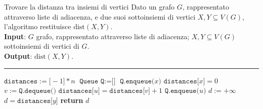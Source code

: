 \documentclass[a4paper, 12pt]{report}
\begin{document}
    \begin{framedalgo}[breakable]{Trovare la distanza tra insiemi di vertici}
        Dato un grafo $G$, rappresentato attraverso liste di adiacenza, e due suoi sottoinsiemi di vertici $X, Y \subseteq V(G)$, l'algoritmo restituisce $\mathrm{dist}(X, Y)$.\\
        \textbf{Input}: $G$ grafo, rappresentato attraverso liste di adiacenza; $X, Y \subseteq V(G)$ sottoinsiemi di vertici di $G$.\\
        \textbf{Output}: $\mathrm{dist}(X, Y)$.

        \hrule
        \begin{algorithmic}[1]
                \State $\texttt{distances}:=\texttt{[}-1\texttt{]} * n$
                \State $\texttt{Queue Q} := \texttt{[}\texttt{]}$
                    \State $\texttt{Q.enqueue(}x\texttt{)}$
                    \State $\texttt{distances[}x\texttt{]} = 0$ 
                \EndFor
                    \State $v := \texttt{Q.dequeue()}$
                         
                            \State $\texttt{distances[}u\texttt{]}=\texttt{distances[}v\texttt{]} + 1$
                            \State $\texttt{Q.enqueue(}u\texttt{)}$
                        \EndIf
                    \EndFor
                \EndWhile
                \State $d := + \infty$
                        \State $d = \texttt{distances[}y\texttt{]}$
                    \EndIf
                \EndFor
                \State \textbf{return} $d$
            \EndFunction
        \end{algorithmic}
    \end{framedalgo}
\end{document}
